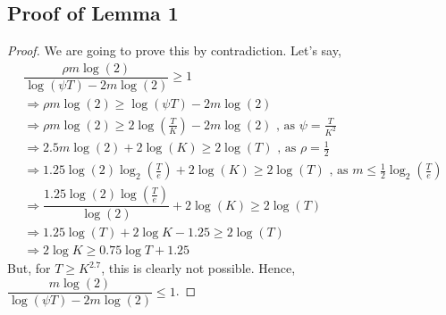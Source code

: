 \subsection{Proof of Lemma 1}
\label{sec:proofTheorem:Lemma1}
\begin{proof}
We are going to prove this by contradiction. Let's say,
\begin{align*}
 & \dfrac{\rho m \log(2)}{\log(\psi T) - 2m\log( 2)} \geq 1 \\
 &\Rightarrow \rho m \log(2) \geq \log(\psi T) - 2m\log( 2) \\
 &\Rightarrow \rho m \log(2) \geq 2\log(\frac{T}{K}) - 2m\log( 2) \text{ , as $\psi=\frac{T}{K^2}$ }\\
 &\Rightarrow 2.5 m \log(2) + 2\log(K) \geq 2\log(T) \text{ , as $\rho=\frac{1}{2}$}\\
 &\Rightarrow 1.25 \log(2) \log_2(\frac{T}{e}) + 2\log(K) \geq 2\log(T) \text{ , as $m\leq \frac{1}{2} \log_2(\frac{T}{e}) $ }\\
 &\Rightarrow \dfrac{1.25 \log (2) \log (\frac{T}{e})}{\log(2)} + 2\log(K) \geq 2\log(T)\\
 &\Rightarrow 1.25 \log(T) + 2\log K - 1.25 \geq 2\log (T)\\
 &\Rightarrow 2\log K \geq 0.75 \log T + 1.25 
\end{align*}
But, for $T\geq K^{2.7}$, this is clearly not possible. Hence, $\dfrac{m \log(2)}{\log(\psi T) - 2m\log( 2)} \leq 1$.
\end{proof}

